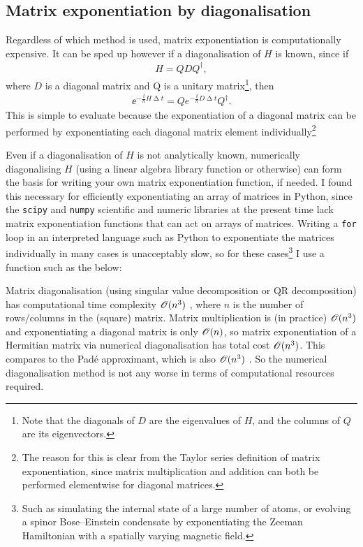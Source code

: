 \subsection{Matrix exponentiation by diagonalisation}\label{sec:matrix_exp_diagonalisation}
Regardless of which method is used, matrix exponentiation is computationally expensive. It can be sped up however if a diagonalisation of $H$ is known, since if
\begin{align}
H = QDQ^\dagger,
\end{align}
where $D$ is a diagonal matrix and Q is a unitary matrix\footnote{Note that the diagonals of $D$ are the eigenvalues of $H$, and the columns of $Q$ are its eigenvectors.}, then
\begin{align}\label{eq:diagonal_expm}
\ee^{-\frac \ii \hbar H \upDelta t} = Q e^{-\frac \ii \hbar D \upDelta t} Q^\dagger.
\end{align}
This is simple to evaluate because the exponentiation of a diagonal matrix can be performed by exponentiating each diagonal matrix element individually\footnote{The reason for this is clear from the Taylor series definition of matrix exponentiation, since matrix multiplication and addition can both be performed elementwise for diagonal matrices.}

Even if a diagonalisation of $H$ is not analytically known, numerically diagonalising $H$ (using a linear algebra library function or otherwise) can form the basis for writing your own matrix exponentiation function, if needed. I found this necessary for efficiently exponentiating an array of matrices in Python, since the \texttt{scipy} and \texttt{numpy} scientific and numeric libraries at the present time lack matrix exponentiation functions that can act on arrays of matrices. Writing a \texttt{for} loop in an interpreted language such as Python to exponentiate the matrices individually in many cases is unacceptably slow, so for these cases\footnote{Such as simulating the internal state of a large number of atoms, or evolving a spinor Bose--Einstein condensate by exponentiating the Zeeman Hamiltonian with a spatially varying magnetic field.} I use a function such as the below:


Matrix diagonalisation (using singular value decomposition or QR decomposition) has computational time complexity $\mathscr{O}(n^3)$ , where $n$ is the number of rows/columns in the (square) matrix. Matrix multiplication is (in practice) $\mathscr{O}(n^3)$ and exponentiating a diagonal matrix is only $\mathscr{O}(n) $, so matrix exponentiation of a Hermitian matrix via numerical diagonalisation has total cost $\mathscr{O}(n^3)$. This compares to the Pad\'e approximant, which is also $\mathscr{O}(n^3)$ \cite{moler_nineteen_2003}. So the numerical diagonalisation method is not any worse in terms of computational resources required.

